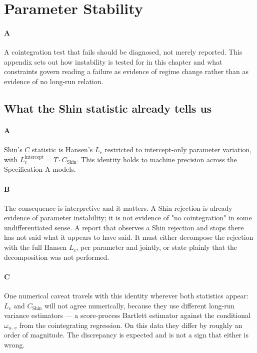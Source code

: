 \section{Parameter Stability}

\paragraph{A}
A cointegration test that fails should be diagnosed, not merely reported. This appendix sets out how instability is tested for in this chapter and what constraints govern reading a failure as evidence of regime change rather than as evidence of no long-run relation.

\subsection{What the Shin statistic already tells us}

\paragraph{A}
Shin's $C$ statistic is Hansen's $L_c$ restricted to intercept-only parameter variation, with $L_c^{\text{intercept}} = T \cdot C_{\text{Shin}}$. This identity holds to machine precision across the Specification A models.

\paragraph{B}
The consequence is interpretive and it matters. A Shin rejection is already evidence of parameter instability; it is not evidence of "no cointegration" in some undifferentiated sense. A report that observes a Shin rejection and stops there has not said what it appears to have said. It must either decompose the rejection with the full Hansen $L_c$, per parameter and jointly, or state plainly that the decomposition was not performed.

\paragraph{C}
One numerical caveat travels with this identity wherever both statistics appear: $L_c$ and $C_{\text{Shin}}$ will not agree numerically, because they use different long-run variance estimators — a score-process Bartlett estimator against the conditional $\omega_{u \cdot v}$ from the cointegrating regression. On this data they differ by roughly an order of magnitude. The discrepancy is expected and is not a sign that either is wrong.

